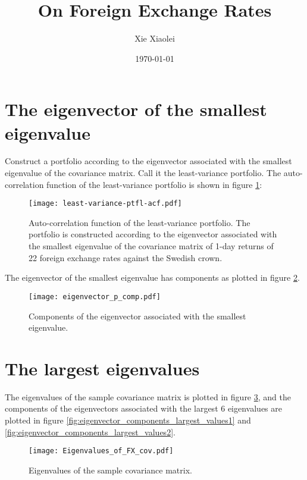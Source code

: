 \documentclass{article}
\title{On Foreign Exchange Rates}
\author{Xie Xiaolei}
\date{\today}
\begin{document}
\maketitle

\section{The eigenvector of the smallest eigenvalue}\label{sec:acf}
Construct a portfolio according to the eigenvector associated with the
smallest eigenvalue of the covariance matrix. Call it the
least-variance portfolio. The auto-correlation function of the
least-variance portfolio is shown in figure \ref{fig:1-day-ret-acf}:
\begin{figure}[htb!]
  \centering
  \texttt{[image: least-variance-ptfl-acf.pdf]}
  \caption{Auto-correlation function of the least-variance
    portfolio. The portfolio is constructed according to the
    eigenvector associated with the smallest eigenvalue of the
    covariance matrix of 1-day returns of 22 foreign exchange rates
    against the Swedish crown.}
  \label{fig:1-day-ret-acf}
\end{figure}

The eigenvector of the smallest eigenvalue has components as plotted
in figure \ref{fig:V_p-components}.
\begin{figure}[htb!]
  \centering
  \texttt{[image: eigenvector\_p\_comp.pdf]}
  \caption{Components of the eigenvector associated with the smallest
    eigenvalue.}
  \label{fig:V_p-components}
\end{figure}

\section{The largest eigenvalues}
The eigenvalues of the sample covariance matrix is plotted in figure
\ref{fig:Eigenvalues_of_FX_cov}, and the components of the
eigenvectors associated with the largest 6 eigenvalues are plotted in
figure \ref{fig:eigenvector_components_largest_values1} and
\ref{fig:eigenvector_components_largest_values2}.

\begin{figure}[htb!]
  \centering
  \texttt{[image: Eigenvalues\_of\_FX\_cov.pdf]}
  \caption{Eigenvalues of the sample covariance matrix.}
  \label{fig:Eigenvalues_of_FX_cov}
\end{figure}
\end{document}
